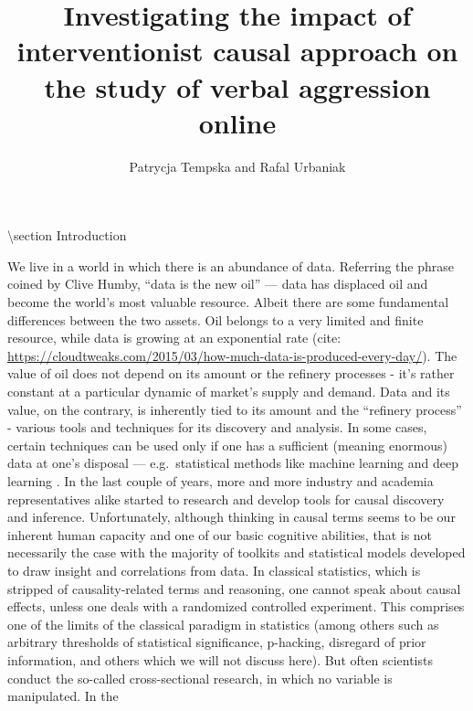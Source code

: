 \documentclass[
  10pt,
  dvipsnames,enabledeprecatedfontcommands]{scrartcl}
\title{Investigating the impact of interventionist causal approach on
the study of verbal aggression online}
\author{Patrycja Tempska and Rafal Urbaniak}
\date{}
\begin{document}
\maketitle

\tableofcontents

\vspace{1mm}
\footnotesize

\normalsize

\textbackslash section Introduction

We live in a world in which there is an abundance of data. Referring the
phrase coined by Clive Humby, ``data is the new oil'' --- data has
displaced oil and become the world's most valuable resource. Albeit
there are some fundamental differences between the two assets. Oil
belongs to a very limited and finite resource, while data is growing at
an exponential rate (cite:
\url{https://cloudtweaks.com/2015/03/how-much-data-is-produced-every-day/}).
The value of oil does not depend on its amount or the refinery processes
- it's rather constant at a particular dynamic of market's supply and
demand. Data and its value, on the contrary, is inherently tied to its
amount and the ``refinery process'' - various tools and techniques for
its discovery and analysis. In some cases, certain techniques can be
used only if one has a sufficient (meaning enormous) data at one's
disposal --- e.g.~statistical methods like machine learning and deep
learning . In the last couple of years, more and more industry and academia
representatives alike started to research and develop tools for causal
discovery and inference. Unfortunately, although thinking in causal
terms seems to be our inherent human capacity and one of our basic
cognitive abilities, that is not necessarily the case with the majority
of toolkits and statistical models developed to draw insight and
correlations from data. In classical statistics, which is stripped of
causality-related terms and reasoning, one cannot speak about causal
effects, unless one deals with a randomized controlled experiment. This
comprises one of the limits of the classical paradigm in statistics
(among others such as arbitrary thresholds of statistical significance,
p-hacking, disregard of prior information, and others which we will not
discuss here). But often scientists conduct the so-called
cross-sectional research, in which no variable is manipulated. In the
\end{document}
